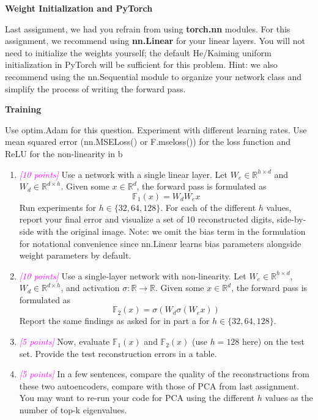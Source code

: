 \documentclass{article}
\newcommand{\field}[1]{\mathbb{#1}}
\newcommand{\1}{\mathbf{1}}
\newcommand{\R}{\field{R}} %
\newcommand{\F}{\field{F}} %
\newcommand{\points}[1]{\small\textcolor{magenta}{\emph{[#1 points]}} \normalsize}
\begin{document}
\textbf{Weight Initialization and PyTorch}

Last assignment, we had you refrain from using \textbf{torch.nn} modules. For this assignment, we recommend using \textbf{nn.Linear} for your linear layers. You will not need to initialize the weights yourself; the default He/Kaiming uniform initialization in PyTorch will be sufficient for this problem. Hint: we also recommend using the nn.Sequential module to organize your network class and simplify the process of writing the forward pass. 

\textbf{Training}

Use optim.Adam for this question. Experiment with different learning rates. Use mean squared error (nn.MSELoss() or F.mseloss()) for the loss function and ReLU for the non-linearity in b

\begin{enumerate}
    \item \points{10} Use a network with a single linear layer. Let $W_e\in\R^{h\times d}$ and $W_d\in\R^{d\times h}$. Given some $x\in\R^d$, the forward pass is formulated as 
    $$\F_1(x) =W_dW_ex$$
    Run experiments for $h\in \{32,64,128\}$. For each of the different $h$ values, report your  final error and visualize a set of 10 reconstructed digits, side-by-side with the original image. Note: we omit the bias term in the formulation for notational convenience since nn.Linear learns bias parameters alongside weight parameters by default.
    
    \item \points{10} Use a single-layer network with non-linearity. Let $W_e\in\R^{h\times d}$,$W_d\in\R^{d\times h}$, and activation $\sigma:\R\rightarrow\R$. Given some $x\in\R^d$, the forward pass is formulated as 
    $$\F_2(x) = \sigma(W_d\sigma(W_ex))$$
    Report the same findings as asked for in part a for $h\in\{32,64,128\}$.
    
    \item \points{5} Now, evaluate $\F_1(x)$ and $\F_2(x)$ (use $h=128$ here) on the test set. Provide the test reconstruction errors in a table.
    
    \item \points{5} In a few sentences, compare the quality of the reconstructions from these two autoencoders, compare with those of PCA from last assignment. You may want to re-run your code for PCA using the different $h$ values as the number of top-k eigenvalues.
\end{enumerate}
\end{document}
